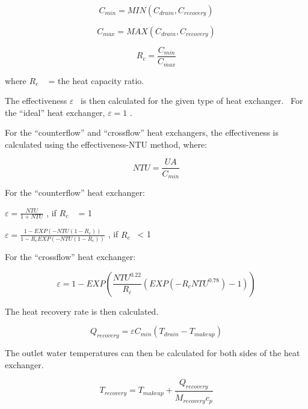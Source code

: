 \begin{equation}
{C_{min}} = MIN({C_{drain}},{C_{recovery}})
\end{equation}

\begin{equation}
{C_{max}} = MAX({C_{drain}},{C_{recovery}})
\end{equation}

\begin{equation}
{R_c} = \frac{{{C_{min}}}}{{{C_{max}}}}
\end{equation}

where \({R_c}\) ~ = the heat capacity ratio.

The effectiveness \(\varepsilon\) ~is then calculated for the given type of heat exchanger.~ For the ``ideal'' heat exchanger, \(\varepsilon = 1\) .

For the ``counterflow'' and ``crossflow'' heat exchangers, the effectiveness is calculated using the effectiveness-NTU method, where:

\begin{equation}
NTU = \frac{{UA}}{{{C_{min}}}}
\end{equation}

For the ``counterflow'' heat exchanger:

\(\varepsilon = \frac{{NTU}}{{1 + NTU}}\) , if \({R_c}\) ~ = 1

\(\varepsilon = \frac{{1 - EXP\left( { - NTU\left( {1 - {R_c}} \right)} \right)}}{{1 - {R_c}EXP\left( { - NTU\left( {1 - {R_c}} \right)} \right)}}\) , if \({R_c}\) ~\textless{} 1

For the ``crossflow'' heat exchanger:

\begin{equation}
\varepsilon  = 1 - EXP\left( {\frac{{NT{U^{0.22}}}}{{{R_c}}}\left( {EXP\left( { - {R_c}NT{U^{0.78}}} \right) - 1} \right)} \right)
\end{equation}

The heat recovery rate is then calculated.

\begin{equation}
{Q_{recovery}} = \varepsilon {C_{min}}\left( {{T_{drain}} - {T_{makeup}}} \right)
\end{equation}

The outlet water temperatures can then be calculated for both sides of the heat exchanger.

\begin{equation}
{T_{recovery}} = {T_{makeup}} + \frac{{{Q_{recovery}}}}{{{{\dot M}_{recovery}}{c_p}}}
\end{equation}

